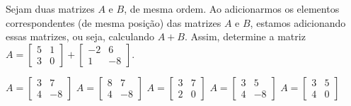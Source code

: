 Sejam duas matrizes $A$ e $B$, de mesma ordem. Ao adicionarmos os elementos correspondentes (de mesma posição) das matrizes $A$ e $B$, estamos adicionando essas matrizes, ou seja, calculando $A+B$. Assim, determine a matriz $A = \left[ \begin{array}{cc}
5 & 1 \\
3 & 0
\end{array} \right] + \left[ \begin{array}{cc}
-2 & 6 \\
1 & -8
\end{array} \right]$.

$A = \left[ \begin{array}{cc} 3 & 7 \\ 4 & -8 \end{array} \right]$
$A = \left[ \begin{array}{cc} 8 & 7 \\ 4 & -8 \end{array} \right]$
$A = \left[ \begin{array}{cc} 3 & 7 \\ 2 & 0 \end{array} \right]$
$A = \left[ \begin{array}{cc} 3 & 5 \\ 4 & -8 \end{array} \right]$
$A = \left[ \begin{array}{cc} 3 & 5 \\ 4 & 0 \end{array} \right]$



